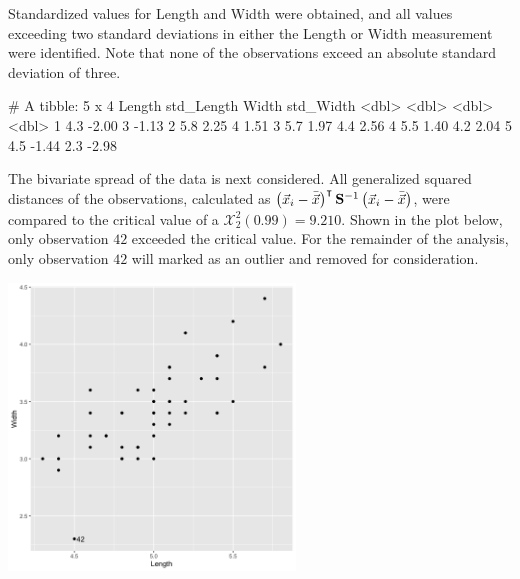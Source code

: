 \begin{enumerate}
\begin{center}
	\end{center}
	Standardized values for Length and Width were obtained, and all values exceeding two standard deviations in either the Length or Width measurement were identified. Note that none of the observations exceed an absolute standard deviation of three.
		\begin{rc}
	# A tibble: 5 x 4
		Length std_Length Width std_Width
		 <dbl>      <dbl> <dbl>     <dbl>
	1    4.3      -2.00   3       -1.13
	2    5.8       2.25   4        1.51
	3    5.7       1.97   4.4      2.56
	4    5.5       1.40   4.2      2.04
	5    4.5      -1.44   2.3     -2.98
	\end{rc}
	The bivariate spread of the data is next considered. All generalized squared distances of the observations, calculated as $\begin{pmatrix}\vec{x}_i - \bar{\vec{x}}\end{pmatrix}^{\intercal}\mathrm{\bf{S}}^{-1}\begin{pmatrix}\vec{x}_i - \bar{\vec{x}}\end{pmatrix}$, were compared to the critical value of a $\mathcal{X}_2^2(0.99)=9.210$. Shown in the plot below, only observation $42$ exceeded the critical value. For the remainder of the analysis, only observation $42$ will marked as an outlier and removed for consideration.
	\begin{center}
		\includegraphics[width=3in]{plot_4_a_LW.png}
	\end{center}


\end{enumerate}
